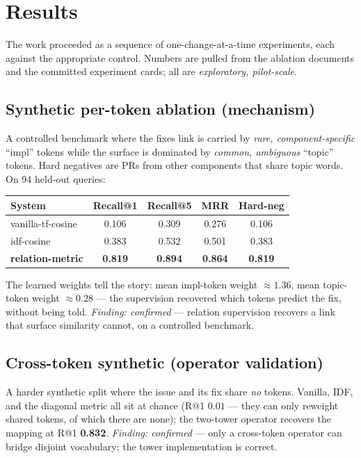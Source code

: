 \documentclass[11pt]{article}
\newcommand{\rel}[1]{\textsf{#1}}
\begin{document}
\section{Results}
\label{sec:results}

The work proceeded as a sequence of one-change-at-a-time experiments, each against
the appropriate control. Numbers are pulled from the ablation documents and the
committed experiment cards; all are \emph{exploratory, pilot-scale}.

\subsection{Synthetic per-token ablation (mechanism)}

A controlled benchmark where the \rel{fixes} link is carried by \emph{rare,
component-specific} ``impl'' tokens while the surface is dominated by \emph{common,
ambiguous} ``topic'' tokens. Hard negatives are PRs from other components that share
topic words. On 94 held-out queries:
\begin{center}
\begin{tabular}{lcccc}
\toprule
System & Recall@1 & Recall@5 & MRR & Hard-neg \\
\midrule
vanilla-tf-cosine & 0.106 & 0.309 & 0.276 & 0.106 \\
idf-cosine & 0.383 & 0.532 & 0.501 & 0.383 \\
\textbf{relation-metric} & \textbf{0.819} & \textbf{0.894} & \textbf{0.864} & \textbf{0.819} \\
\bottomrule
\end{tabular}
\end{center}
The learned weights tell the story: mean impl-token weight $\approx 1.36$, mean
topic-token weight $\approx 0.28$ --- the supervision recovered which tokens predict
the fix, without being told. \emph{Finding: confirmed} --- relation supervision
recovers a link that surface similarity cannot, on a controlled benchmark.

\subsection{Cross-token synthetic (operator validation)}

A harder synthetic split where the issue and its fix share \emph{no} tokens. Vanilla,
IDF, and the diagonal metric all sit at chance (R@1 $0.01$ --- they can only reweight
shared tokens, of which there are none); the two-tower operator recovers the mapping
at R@1 \textbf{0.832}. \emph{Finding: confirmed} --- only a cross-token operator can
bridge disjoint vocabulary; the tower implementation is correct.
\end{document}
